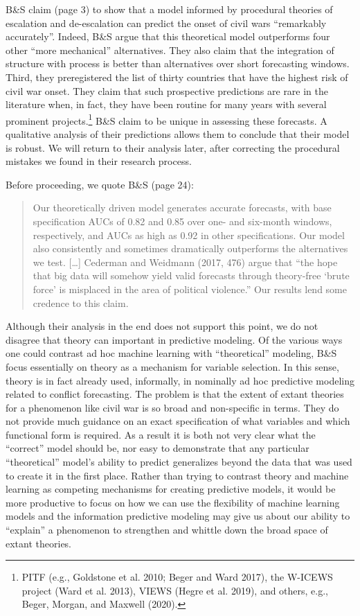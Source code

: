 \documentclass[
]{article}
\begin{document}
B\&S claim (page 3) to show that a model informed by procedural theories of escalation and de-escalation can predict the onset of civil wars ``remarkably accurately''. Indeed, B\&S argue that this theoretical model outperforms four other ``more mechanical'' alternatives. They also claim that the integration of structure with process is better than alternatives over short forecasting windows. Third, they preregistered the list of thirty countries that have the highest risk of civil war onset. They claim that such prospective predictions are rare in the literature when, in fact, they have been routine for many years with several prominent projects.\footnote{PITF (e.g., Goldstone et al. 2010; Beger and Ward 2017), the W-ICEWS project (Ward et al. 2013), VIEWS (Hegre et al. 2019), and others, e.g., Beger, Morgan, and Maxwell (2020).} B\&S claim to be unique in assessing these forecasts. A qualitative analysis of their predictions allows them to conclude that their model is robust. We will return to their analysis later, after correcting the procedural mistakes we found in their research process.

Before proceeding, we quote B\&S (page 24):

\begin{quote}
Our theoretically driven model generates accurate forecasts, with base specification AUCs of 0.82 and 0.85 over one- and six-month windows, respectively, and AUCs as high as 0.92 in other specifications. Our model also consistently and sometimes dramatically outperforms the alternatives we test. {[}\ldots{]} Cederman and Weidmann (2017, 476) argue that ``the hope that big data will somehow yield valid forecasts through theory-free `brute force' is misplaced in the area of political violence.'' Our results lend some credence to this claim.
\end{quote}

Although their analysis in the end does not support this point, we do not disagree that theory can important in predictive modeling. Of the various ways one could contrast ad hoc machine learning with ``theoretical'' modeling, B\&S focus essentially on theory as a mechanism for variable selection. In this sense, theory is in fact already used, informally, in nominally ad hoc predictive modeling related to conflict forecasting. The problem is that the extent of extant theories for a phenomenon like civil war is so broad and non-specific in terms. They do not provide much guidance on an exact specification of what variables and which functional form is required. As a result it is both not very clear what the ``correct'' model should be, nor easy to demonstrate that any particular ``theoretical'' model's ability to predict generalizes beyond the data that was used to create it in the first place. Rather than trying to contrast theory and machine learning as competing mechanisms for creating predictive models, it would be more productive to focus on how we can use the flexibility of machine learning models and the information predictive modeling may give us about our ability to ``explain'' a phenomenon to strengthen and whittle down the broad space of extant theories.
\end{document}
